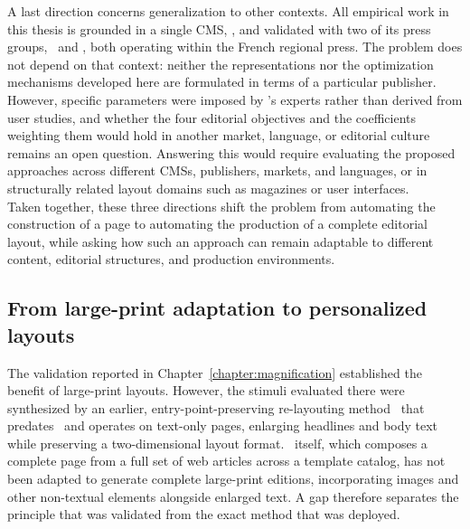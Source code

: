 A last direction concerns generalization to other contexts. All empirical work in this thesis is grounded in a single CMS, \melody, and validated with two of its press groups, \publihebdos\ and \laprovence, both operating within the French regional press. The problem does not depend on that context: neither the representations nor the optimization mechanisms developed here are formulated in terms of a particular publisher. However, specific parameters  were imposed by \melody's experts rather than derived from user studies, and whether the four editorial objectives and the coefficients weighting them would hold in another market, language, or editorial culture remains an open question. 
Answering this would require evaluating the proposed approaches across different CMSs, publishers, markets, and languages, or in structurally related layout domains such as magazines or user interfaces. \
\\
Taken together, these three directions shift the problem from automating the construction of a page to automating the production of a complete editorial layout, while asking how such an approach can remain adaptable to different content, editorial structures, and production environments.

\subsection{From large-print adaptation to personalized layouts}
\label{sec:perspectives-personalization}

The validation reported in Chapter~\ref{chapter:magnification} established the benefit of large-print layouts. However, the stimuli evaluated there were synthesized by an earlier, entry-point-preserving re-layouting method~ that predates \methodNameGeneral\ and operates on text-only pages, enlarging headlines and body text while preserving a two-dimensional layout format. \methodNameGeneral\ itself, which composes a complete page from a full set of web articles across a template catalog, has not been adapted to generate complete large-print editions, incorporating images and other non-textual elements alongside enlarged text. A gap therefore separates the principle that was validated from the exact method that was deployed.

